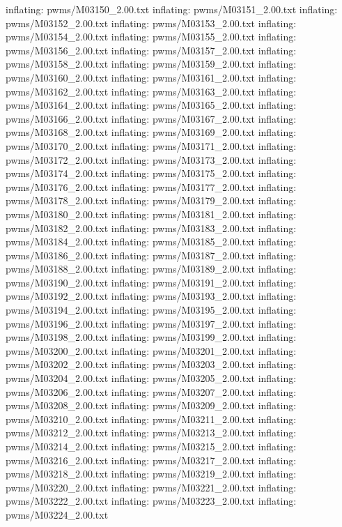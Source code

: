 \documentclass[letterpaper,10pt,english]{sphinxmanual}
\begin{document}
{\begin{sphinxVerbatim}[commandchars=\\\{\}]
  inflating: pwms/M03150\_2.00.txt
  inflating: pwms/M03151\_2.00.txt
  inflating: pwms/M03152\_2.00.txt
  inflating: pwms/M03153\_2.00.txt
  inflating: pwms/M03154\_2.00.txt
  inflating: pwms/M03155\_2.00.txt
  inflating: pwms/M03156\_2.00.txt
  inflating: pwms/M03157\_2.00.txt
  inflating: pwms/M03158\_2.00.txt
  inflating: pwms/M03159\_2.00.txt
  inflating: pwms/M03160\_2.00.txt
  inflating: pwms/M03161\_2.00.txt
  inflating: pwms/M03162\_2.00.txt
  inflating: pwms/M03163\_2.00.txt
  inflating: pwms/M03164\_2.00.txt
  inflating: pwms/M03165\_2.00.txt
  inflating: pwms/M03166\_2.00.txt
  inflating: pwms/M03167\_2.00.txt
  inflating: pwms/M03168\_2.00.txt
  inflating: pwms/M03169\_2.00.txt
  inflating: pwms/M03170\_2.00.txt
  inflating: pwms/M03171\_2.00.txt
  inflating: pwms/M03172\_2.00.txt
  inflating: pwms/M03173\_2.00.txt
  inflating: pwms/M03174\_2.00.txt
  inflating: pwms/M03175\_2.00.txt
  inflating: pwms/M03176\_2.00.txt
  inflating: pwms/M03177\_2.00.txt
  inflating: pwms/M03178\_2.00.txt
  inflating: pwms/M03179\_2.00.txt
  inflating: pwms/M03180\_2.00.txt
  inflating: pwms/M03181\_2.00.txt
  inflating: pwms/M03182\_2.00.txt
  inflating: pwms/M03183\_2.00.txt
  inflating: pwms/M03184\_2.00.txt
  inflating: pwms/M03185\_2.00.txt
  inflating: pwms/M03186\_2.00.txt
  inflating: pwms/M03187\_2.00.txt
  inflating: pwms/M03188\_2.00.txt
  inflating: pwms/M03189\_2.00.txt
  inflating: pwms/M03190\_2.00.txt
  inflating: pwms/M03191\_2.00.txt
  inflating: pwms/M03192\_2.00.txt
  inflating: pwms/M03193\_2.00.txt
  inflating: pwms/M03194\_2.00.txt
  inflating: pwms/M03195\_2.00.txt
  inflating: pwms/M03196\_2.00.txt
  inflating: pwms/M03197\_2.00.txt
  inflating: pwms/M03198\_2.00.txt
  inflating: pwms/M03199\_2.00.txt
  inflating: pwms/M03200\_2.00.txt
  inflating: pwms/M03201\_2.00.txt
  inflating: pwms/M03202\_2.00.txt
  inflating: pwms/M03203\_2.00.txt
  inflating: pwms/M03204\_2.00.txt
  inflating: pwms/M03205\_2.00.txt
  inflating: pwms/M03206\_2.00.txt
  inflating: pwms/M03207\_2.00.txt
  inflating: pwms/M03208\_2.00.txt
  inflating: pwms/M03209\_2.00.txt
  inflating: pwms/M03210\_2.00.txt
  inflating: pwms/M03211\_2.00.txt
  inflating: pwms/M03212\_2.00.txt
  inflating: pwms/M03213\_2.00.txt
  inflating: pwms/M03214\_2.00.txt
  inflating: pwms/M03215\_2.00.txt
  inflating: pwms/M03216\_2.00.txt
  inflating: pwms/M03217\_2.00.txt
  inflating: pwms/M03218\_2.00.txt
  inflating: pwms/M03219\_2.00.txt
  inflating: pwms/M03220\_2.00.txt
  inflating: pwms/M03221\_2.00.txt
  inflating: pwms/M03222\_2.00.txt
  inflating: pwms/M03223\_2.00.txt
  inflating: pwms/M03224\_2.00.txt

\end{sphinxVerbatim}}
\end{document}
